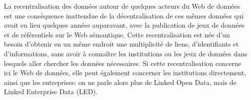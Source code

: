 La recentralisation des données autour de quelques acteurs du Web de données est une conséquence inattendue de la décentralisation de ces mêmes données qui avait eu lieu quelques années auparavant, avec la publication de jeux de données et de référentiels sur le Web sémantique. Cette recentralisation est née d'un besoin d'obtenir en un même endroit une multiplicité de liens, d'identifiants et d'informations, sans avoir à connaître les institutions ou les jeux de données dans lesquels aller chercher les données nécessaires. Si cette recentralisation concerne ici le Web de données, elle peut également concerner les institutions directement, ainsi que les entreprises: on ne parle alors plus de Linked Open Data, mais de Linked Enterprise Data (LED).